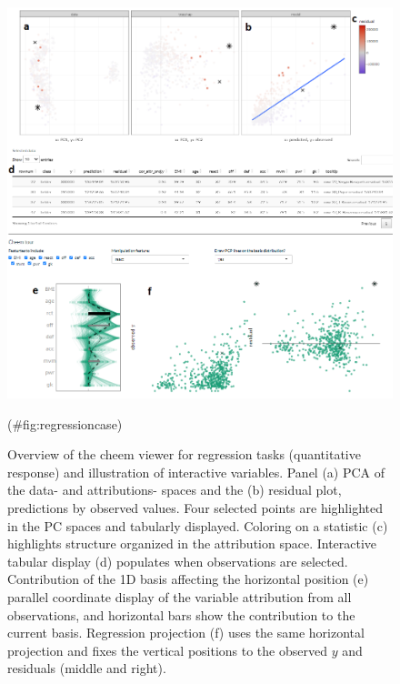 \documentclass[
]{jss}
\begin{document}
\begin{CodeChunk}
\begin{figure}

{\centering \includegraphics[width=1\linewidth]{./figures/app_regression_interactions} 

}

\caption[Overview of the cheem viewer for regression tasks (quantitative response) and illustration of interactive variables]{Overview of the cheem viewer for regression tasks (quantitative response) and illustration of interactive variables. Panel (a) PCA of the data- and attributions- spaces and the (b) residual plot, predictions by observed values. Four selected points are highlighted in the PC spaces and tabularly displayed. Coloring on a statistic (c) highlights structure organized in the attribution space. Interactive tabular display (d) populates when observations are selected. Contribution of the 1D basis affecting the horizontal position (e) parallel coordinate display of the variable attribution from all observations, and horizontal bars show the contribution to the current basis. Regression projection (f) uses the same horizontal projection and fixes the vertical positions to the observed $y$ and residuals (middle and right).}(\#fig:regressioncase)
\end{figure}
\end{CodeChunk}
\end{document}
